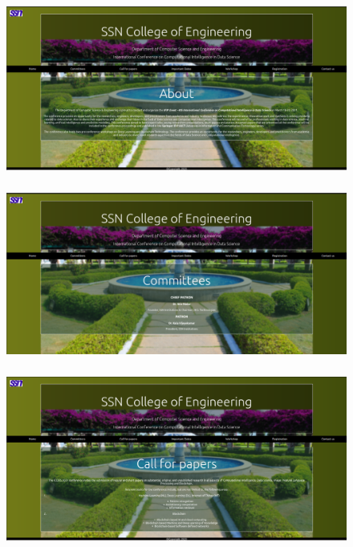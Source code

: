\documentclass[12pt,letterpaper]{article}
\begin{document}
\subsubsection*{}
\begin{figure}[h]
    \centering
    \includegraphics[width = \textwidth]{Pics/home.png}
\end{figure}

\newpage
\subsubsection*{}
\begin{figure}[h]
    \centering
    \includegraphics[width = \textwidth]{Pics/committee.png}
\end{figure}

\newpage
\subsubsection*{}
\begin{figure}[h]
    \centering
    \includegraphics[width = \textwidth]{Pics/paper.png}
\end{figure}
\end{document}
